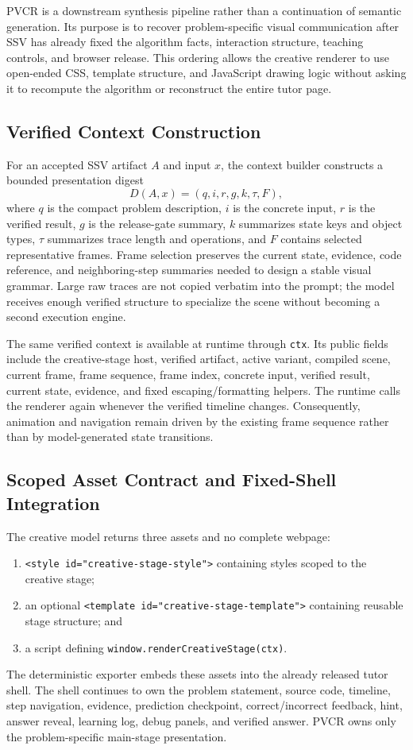 \documentclass[letterpaper]{article}
\newcommand{\ssv}{\textsc{SSV}}
\newcommand{\pvcr}{\textsc{PVCR}}
\begin{document}
\pvcr{} is a downstream synthesis pipeline rather than a continuation of semantic generation. Its purpose is to recover problem-specific visual communication after \ssv{} has already fixed the algorithm facts, interaction structure, teaching controls, and browser release. This ordering allows the creative renderer to use open-ended CSS, template structure, and JavaScript drawing logic without asking it to recompute the algorithm or reconstruct the entire tutor page.

\subsection{Verified Context Construction}

For an accepted \ssv{} artifact $A$ and input $x$, the context builder constructs a bounded presentation digest
\[
D(A,x)=(q,i,r,g,k,\tau,F),
\]
where $q$ is the compact problem description, $i$ is the concrete input, $r$ is the verified result, $g$ is the release-gate summary, $k$ summarizes state keys and object types, $\tau$ summarizes trace length and operations, and $F$ contains selected representative frames. Frame selection preserves the current state, evidence, code reference, and neighboring-step summaries needed to design a stable visual grammar. Large raw traces are not copied verbatim into the prompt; the model receives enough verified structure to specialize the scene without becoming a second execution engine.

The same verified context is available at runtime through \texttt{ctx}. Its public fields include the creative-stage host, verified artifact, active variant, compiled scene, current frame, frame sequence, frame index, concrete input, verified result, current state, evidence, and fixed escaping/formatting helpers. The runtime calls the renderer again whenever the verified timeline changes. Consequently, animation and navigation remain driven by the existing frame sequence rather than by model-generated state transitions.

\subsection{Scoped Asset Contract and Fixed-Shell Integration}

The creative model returns three assets and no complete webpage:
\begin{enumerate}
  \item \texttt{<style id="creative-stage-style">} containing styles scoped to the creative stage;
  \item an optional \texttt{<template id="creative-stage-template">} containing reusable stage structure; and
  \item a script defining \texttt{window.}\allowbreak\texttt{renderCreativeStage}\allowbreak\texttt{(ctx)}.
\end{enumerate}
The deterministic exporter embeds these assets into the already released tutor shell. The shell continues to own the problem statement, source code, timeline, step navigation, evidence, prediction checkpoint, correct/incorrect feedback, hint, answer reveal, learning log, debug panels, and verified answer. \pvcr{} owns only the problem-specific main-stage presentation.
\end{document}
